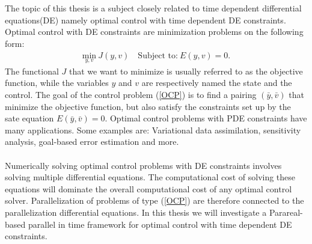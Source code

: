 \\
\\
The topic of this thesis is a subject closely related to time dependent differential equations(DE) namely optimal control with time dependent DE constraints. Optimal control with DE constraints are minimization problems on the following form:
\begin{align}
\underset{y,v}{\text{min}} \ J(y,v) \quad \textrm{Subject to:} \ E(y,v)=0. \label{OCP}
\end{align}
The functional $J$ that we want to minimize is usually referred to as the objective function, while the variables $y$ and $v$ are respectively named the state and the control. The goal of the control problem (\ref{OCP}) is to find a pairing $(\bar y,\bar v)$ that minimize the objective function, but also satisfy the constraints set up by the sate equation $ E(\bar y,\bar v)=0$. Optimal control problems with PDE constraints have many applications. Some examples are: Variational data assimilation, sensitivity analysis, goal-based error estimation and more.
\\
\\
Numerically solving optimal control problems with DE constraints involves solving multiple differential equations. The computational cost of solving these equations will dominate the overall computational cost of any optimal control solver. Parallelization of problems of type (\ref{OCP}) are therefore connected to the parallelization differential equations. In this thesis we will investigate a Parareal-based parallel in time framework for optimal control with time dependent DE constraints.  
